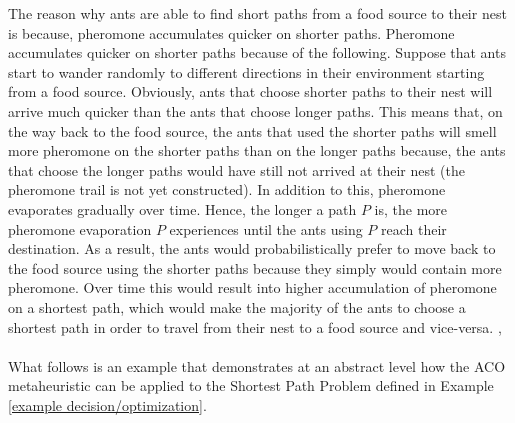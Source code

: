 \documentclass{article}
\begin{document}
The reason why ants are able to find short paths from a food source to their nest is because, pheromone accumulates quicker on shorter paths. Pheromone accumulates quicker on shorter paths because of the following. Suppose that ants start to wander randomly to different directions in their environment starting from a food source. Obviously, ants that choose shorter paths to their nest will arrive much quicker than the ants that choose longer paths. This means that, on the way back to the food source, the ants that used the shorter paths will smell more pheromone on the shorter paths than on the longer paths because, the ants that choose the longer paths would have still not arrived at their nest (the pheromone trail is not yet constructed). In addition to this, pheromone evaporates gradually over time. Hence, the longer a path $P$ is, the more pheromone evaporation $P$ experiences until the ants using $P$ reach their destination. As a result, the ants would probabilistically prefer to move back to the food source using the shorter paths because they simply would contain more pheromone. Over time this would result into higher accumulation of pheromone on a shortest path, which would make the majority of the ants to choose a shortest path in order to travel from their nest to a food source and vice-versa. \cite{dorigo_gambardella_1997}, \cite{dorigo_stutzle_thomas_2004}\\\\
What follows is an example that demonstrates at an abstract level how the ACO metaheuristic can be applied to the Shortest Path Problem defined in Example \ref{example decision/optimization}.
\end{document}
